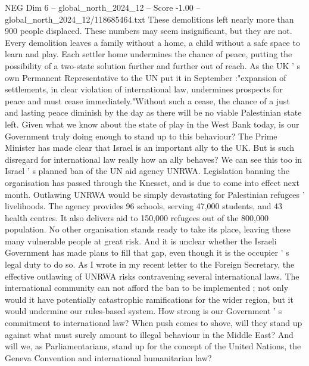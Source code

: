 \begin{textsample}{NEG Dim 6 – global\_north\_2024\_12 – Score -1.00 – global\_north\_2024\_12/118685464.txt}
These demolitions left nearly more than 900 people displaced.
These numbers may seem insignificant, but they are not.
Every demolition leaves a family without a home, a child without a safe space to learn and play.
Each settler home undermines the chance of peace, putting the possibility of a two-state solution further and further out of reach.
As the UK ' s own Permanent Representative to the UN put it in September :"expansion of settlements, in clear violation of international law, undermines prospects for peace and must cease immediately."Without such a cease, the chance of a just and lasting peace diminish by the day as there will be no viable Palestinian state left.
Given what we know about the state of play in the West Bank today, is our Government truly doing enough to stand up to this behaviour?
The Prime Minister has made clear that Israel is an important ally to the UK.
But is such disregard for international law really how an ally behaves?
We can see this too in Israel ' s planned ban of the UN aid agency UNRWA.
Legislation banning the organisation has passed through the Knesset, and is due to come into effect next month.
Outlawing UNRWA would be simply devastating for Palestinian refugees ' livelihoods.
The agency provides 96 schools, serving 47,000 students, and 43 health centres.
It also delivers aid to 150,000 refugees out of the 800,000 population.
No other organisation stands ready to take its place, leaving these many vulnerable people at great risk.
And it is unclear whether the Israeli Government has made plans to fill that gap, even though it is the occupier ' s legal duty to do so.
As I wrote in my recent letter to the Foreign Secretary, the effective outlawing of UNRWA risks contravening several international laws.
The international community can not afford the ban to be implemented ; not only would it have potentially catastrophic ramifications for the wider region, but it would undermine our rules-based system.
How strong is our Government ' s commitment to international law?
When push comes to shove, will they stand up against what must surely amount to illegal behaviour in the Middle East?
And will we, as Parliamentarians, stand up for the concept of the United Nations, the Geneva Convention and international humanitarian law?

\end{textsample}
